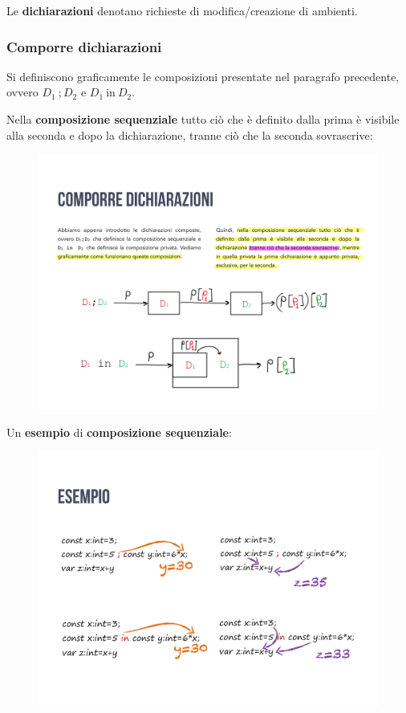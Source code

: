\documentclass[a4paper]{article}
\begin{document}
	\begin{boxdef}
		Le \textcolor{Red3}{\textbf{dichiarazioni}} denotano richieste di modifica/creazione di ambienti.
	\end{boxdef}\newpage
	
	\subsubsection{Comporre dichiarazioni}
	
	Si definiscono graficamente le composizioni presentate nel paragrafo precedente, ovvero $D_{1} \: ; D_{2}$ e $D_{1} \: \mathrm{in} \: D_{2}$.\newline
	
	\noindent
	Nella \textbf{composizione sequenziale} tutto ciò che è definito dalla prima  è visibile alla seconda e dopo la dichiarazione, tranne ciò che la seconda sovrascrive:
	\begin{figure}[!htp]
		\centering
		\includegraphics[width=\textwidth]{img/composizione_sequenziale.pdf}
	\end{figure}

	\noindent
	Un \textcolor{Green4}{\textbf{esempio}} di \textbf{composizione sequenziale}:
	\begin{figure}[!htp]
		\centering
		\includegraphics[width=\textwidth]{img/esempio_composizione_sequenziale.pdf}
	\end{figure}
	
\end{document}
